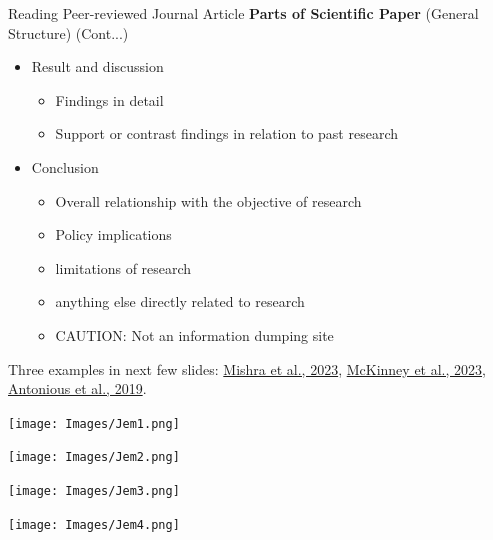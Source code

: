 \documentclass[11pt]{beamer}
\begin{document}
\begin{frame}{Reading Peer-reviewed Journal Article}
\textbf{Parts of Scientific Paper} (General Structure) (Cont...)
\vspace{0.3cm}
\begin{itemize}
    \item Result and discussion
        \begin{itemize}
            \item Findings in detail
            \item Support or contrast findings in relation to past research
        \end{itemize}
        \vspace{0.1cm}
    \item Conclusion
        \begin{itemize}
            \item Overall relationship with the objective of research
            \item Policy implications
            \item limitations of research
            \item anything else directly related to research 
            \item {\color{red}CAUTION:} Not an information dumping site
        \end{itemize}
\end{itemize}
Three examples in next few slides: {\color{blue}\href{https://doi.org/10.1016/j.jenvman.2023.118225}{Mishra et al., 2023}}, {\color{blue}\href{https://doi.org/10.1016/j.foreco.2023.120987}{McKinney et al., 2023}}, {\color{blue}\href{https://doi.org/10.1080/09603123.2019.1602252}{Antonious et al., 2019}}.
\end{frame}

\begin{frame}{}
    \centering \texttt{[image: Images/Jem1.png]}
\end{frame}

\begin{frame}{}
    \centering \texttt{[image: Images/Jem2.png]}
\end{frame}

\begin{frame}{}
    \centering \texttt{[image: Images/Jem3.png]}
\end{frame}

\begin{frame}{}
    \centering \texttt{[image: Images/Jem4.png]}
\end{frame}
\end{document}
